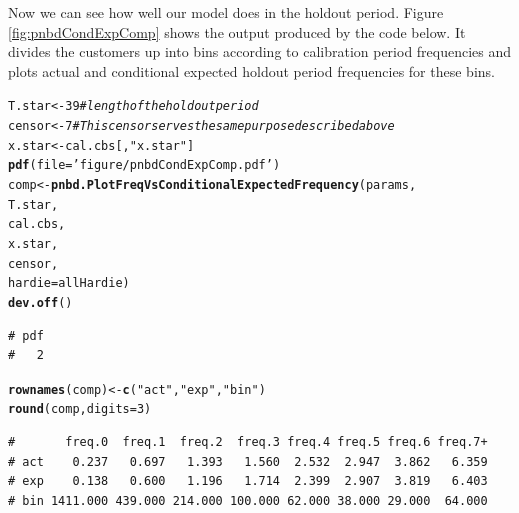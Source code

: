 \documentclass[10pt, letterpaper, onecolumn, oneside, final]{article}\usepackage[]{graphicx}\usepackage[]{color}
\makeatletter
\newcommand{\hlnum}[1]{\textcolor[rgb]{0.686,0.059,0.569}{#1}}%
\newcommand{\hlstr}[1]{\textcolor[rgb]{0.192,0.494,0.8}{#1}}%
\newcommand{\hlcom}[1]{\textcolor[rgb]{0.678,0.584,0.686}{\textit{#1}}}%
\newcommand{\hlstd}[1]{\textcolor[rgb]{0.345,0.345,0.345}{#1}}%
\newcommand{\hlkwb}[1]{\textcolor[rgb]{0.69,0.353,0.396}{#1}}%
\newcommand{\hlkwc}[1]{\textcolor[rgb]{0.333,0.667,0.333}{#1}}%
\newcommand{\hlkwd}[1]{\textcolor[rgb]{0.737,0.353,0.396}{\textbf{#1}}}%
\newenvironment{kframe}{%
 \def\at@end@of@kframe{}%
 \ifinner\ifhmode%
  \def\at@end@of@kframe{\end{minipage}}%
  \begin{minipage}{\columnwidth}%
 \fi\fi%
 \def\FrameCommand##1{\hskip\@totalleftmargin \hskip-\fboxsep
 \colorbox{shadecolor}{##1}\hskip-\fboxsep
     \hskip-\linewidth \hskip-\@totalleftmargin \hskip\columnwidth}%
 \MakeFramed {\advance\hsize-\width
   \@totalleftmargin\z@ \linewidth\hsize
   \@setminipage}}%
 {\par\unskip\endMakeFramed%
 \at@end@of@kframe}
\newenvironment{knitrout}{}{} %
\makeatother
\begin{document}
Now we can see how well our model does in the holdout period. Figure
\ref{fig:pnbdCondExpComp} shows the output produced by the code below. It
divides the customers up into bins according to calibration period
frequencies and plots actual and conditional expected holdout period
frequencies for these bins.

\begin{knitrout}\small
{}\color{fgcolor}\begin{kframe}
\begin{alltt}
\hlstd{T.star} \hlkwb{<-} \hlnum{39} \hlcom{# length of the holdout period}
\hlstd{censor} \hlkwb{<-} \hlnum{7}  \hlcom{# This censor serves the same purpose described above}
\hlstd{x.star} \hlkwb{<-} \hlstd{cal.cbs[,}\hlstr{"x.star"}\hlstd{]}
\hlkwd{pdf}\hlstd{(}\hlkwc{file} \hlstd{=} \hlstr{'figure/pnbdCondExpComp.pdf'}\hlstd{)}
\hlstd{comp} \hlkwb{<-} \hlkwd{pnbd.PlotFreqVsConditionalExpectedFrequency}\hlstd{(params,}
                                                    \hlstd{T.star,}
                                                    \hlstd{cal.cbs,}
                                                    \hlstd{x.star,}
                                                    \hlstd{censor,}
                                                    \hlkwc{hardie} \hlstd{= allHardie)}
\hlkwd{dev.off}\hlstd{()}
\end{alltt}
\begin{verbatim}
# pdf 
#   2
\end{verbatim}
\begin{alltt}
\hlkwd{rownames}\hlstd{(comp)} \hlkwb{<-} \hlkwd{c}\hlstd{(}\hlstr{"act"}\hlstd{,} \hlstr{"exp"}\hlstd{,} \hlstr{"bin"}\hlstd{)}
\hlkwd{round}\hlstd{(comp,} \hlkwc{digits} \hlstd{=} \hlnum{3}\hlstd{)}
\end{alltt}
\begin{verbatim}
#       freq.0  freq.1  freq.2  freq.3 freq.4 freq.5 freq.6 freq.7+
# act    0.237   0.697   1.393   1.560  2.532  2.947  3.862   6.359
# exp    0.138   0.600   1.196   1.714  2.399  2.907  3.819   6.403
# bin 1411.000 439.000 214.000 100.000 62.000 38.000 29.000  64.000
\end{verbatim}
\end{kframe}
\end{knitrout}
\end{document}
